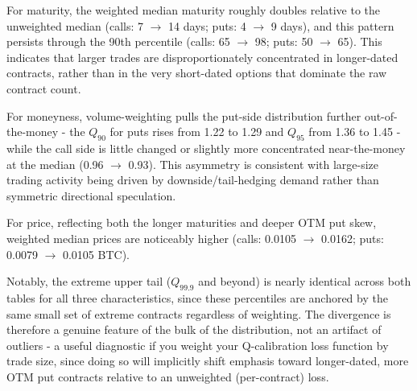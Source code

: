 \documentclass[11pt]{article}
\begin{document}
For maturity, the weighted median maturity roughly doubles relative to the unweighted median (calls: 7 $\to$ 14 days; puts: 4 $\to$ 9 days), and this pattern persists through the 90th percentile (calls: 65 $\to$ 98; puts: 50 $\to$ 65). This indicates that larger trades are disproportionately concentrated in longer-dated contracts, rather than in the very short-dated options that dominate the raw contract count.

For moneyness, volume-weighting pulls the put-side distribution further out-of-the-money - the $Q_{90}$ for puts rises from 1.22 to 1.29 and $Q_{95}$
from 1.36 to 1.45 - while the call side is little changed or slightly more concentrated near-the-money at the median (0.96 $\to$ 0.93). This asymmetry is consistent with large-size trading activity being driven by downside/tail-hedging demand rather than symmetric directional speculation.

For price, reflecting both the longer maturities and deeper OTM put skew, weighted median prices are noticeably higher (calls: 0.0105 $\to$ 0.0162; puts: 0.0079 $\to$ 0.0105 BTC).

Notably, the extreme upper tail ($Q_{99.9}$ and beyond) is nearly identical across both tables for all three characteristics, since these percentiles are anchored by the same small set of extreme contracts regardless of weighting. The divergence is therefore a genuine feature of the bulk of the distribution, not an artifact of outliers - a useful diagnostic if you weight your Q-calibration loss function by trade size, since doing so will implicitly shift emphasis toward longer-dated, more OTM put contracts relative to an unweighted (per-contract) loss.
\end{document}
